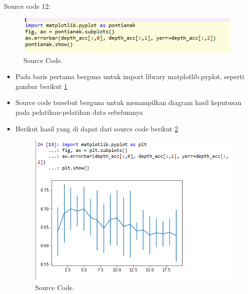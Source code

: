 Source code 12:
		\begin{figure}[ht]
		\centerline{\includegraphics[width=1\textwidth]{figures/im/imQ12.png}}
		\caption{Source Code.}
		\label{duabelasQ}
		\end{figure}
\begin{itemize}
\item Pada baris pertama berguna untuk import library matplotlib.pyplot, seperti gambar berikut \ref{duabelasQ}
\item Source code tersebut berguna untuk menampilkan diagram hasil keputusan pada pelatihan-pelatihan data sebelumnya
\item Berikut hasil yang di dapat dari source code berikut \ref{duabelasC}
		\begin{figure}[ht]
		\centerline{\includegraphics[width=1\textwidth]{figures/im/imCode12.png}}
		\caption{Source Code.}
		\label{duabelasC}
		\end{figure}
\end{itemize}

